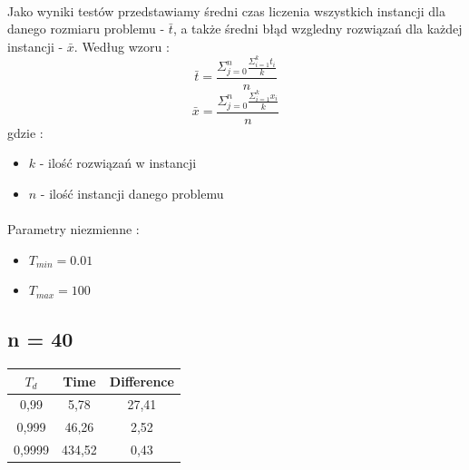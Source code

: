 \documentclass[wide,a4paper,titlepage,12pt] {article}
\begin{document}
\paragraph{}
Jako wyniki testów przedstawiamy średni czas liczenia wszystkich instancji dla danego rozmiaru problemu - $\bar{t}$, a także średni błąd wzgledny  rozwiązań dla każdej instancji - $\bar{x}$. Według wzoru : \\
\begin{equation}
	\bar{t} = \frac{\Sigma_{j=0}^{n}\frac{\Sigma_{i=1}^{k}t_{i}}{k}}{n}
\end{equation}
\begin{equation}
	\bar{x} = \frac{\Sigma_{j=0}^{n}\frac{\Sigma_{i=1}^{k}x_{i}}{k}}{n}
\end{equation}
gdzie : \\
\begin{itemize}
  \item $k$ - ilość rozwiązań w instancji
  \item $n$ - ilość instancji danego problemu
\end{itemize}
\paragraph{}
Parametry niezmienne : 
\begin{itemize}
  \item $T_{min} = 0.01$
  \item $T_{max} = 100$
\end{itemize}
\newpage
\subsection{n = 40}
\begin{center}
    \begin{tabular}{|c|c|c|}
      \hline
       $T_{d}$ & Time & Difference \\ \hline
       0,99 & 5,78 & 27,41 \\ \hline
       0,999 & 46,26 & 2,52 \\ \hline
       0,9999 & 434,52 & 0,43 \\ \hline
  \end{tabular}
\end{center}
\end{document}
